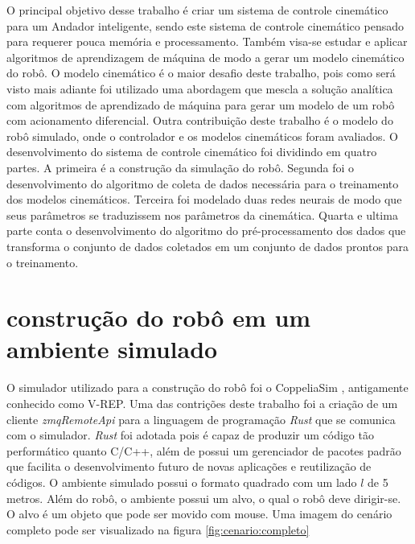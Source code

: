 
\label{Cap:Desenvolvimento}

O principal objetivo desse trabalho é criar um sistema de controle cinemático para
um Andador inteligente, sendo este  sistema de controle cinemático pensado para requerer
pouca memória e processamento. Também visa-se estudar e aplicar algoritmos
de aprendizagem de máquina de modo a gerar um modelo cinemático do robô.
O modelo cinemático é o maior desafio deste trabalho, pois como será visto
mais adiante foi utilizado uma abordagem que mescla a solução analítica com
algoritmos de aprendizado de máquina para gerar um modelo de um robô com
acionamento diferencial. Outra contribuição deste trabalho é o modelo do
robô simulado, onde o controlador e os modelos cinemáticos foram avaliados.
O desenvolvimento do  sistema de controle cinemático foi dividindo em quatro
partes. A primeira é a construção da simulação do robô.
Segunda foi o desenvolvimento do algoritmo de coleta de dados necessária
para o treinamento dos modelos cinemáticos. Terceira foi  modelado
duas redes neurais de modo que seus parâmetros se traduzissem nos parâmetros
da cinemática. Quarta e ultima parte conta o desenvolvimento
do algoritmo do pré-processamento dos dados que transforma o conjunto
de dados coletados em um conjunto de dados prontos para o treinamento. 


\section{construção do robô em um ambiente simulado}
O simulador utilizado para a construção do robô foi o CoppeliaSim
\cite{rooban2021coppeliasim}, antigamente conhecido como V-REP.
Uma das contrições deste trabalho foi a criação de um cliente 
\textit{zmqRemoteApi} para a linguagem de programação \textit{Rust}
que se comunica com o simulador. \textit{Rust} foi adotada pois
é capaz de produzir um código tão performático quanto C/C++, além
de possui um gerenciador de pacotes padrão que facilita o desenvolvimento
futuro de novas aplicações e reutilização de códigos. O ambiente
simulado possui o formato quadrado com um lado $l$ de 5 metros.
Além do robô, o ambiente possui um alvo, o qual o robô deve
dirigir-se. O alvo é um objeto que pode ser movido com mouse. 
Uma imagem do cenário completo pode ser visualizado na figura
\ref{fig:cenario:completo}

